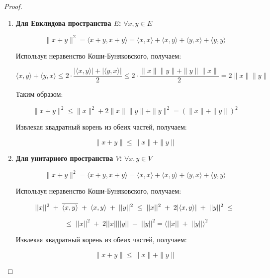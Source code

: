 \documentclass[12px]{report}
\begin{document}
\vspace{0.2cm}
\begin{proof}
    \begin{enumerate}
        \item \textbf{Для Евклидова пространства \( E \):} \quad \(\forall x, y \in E\)
        
        \[
        \|x + y\|^2 = \langle x + y, x + y \rangle = \langle x, x \rangle + \langle x, y \rangle + \langle y, x \rangle + \langle y, y \rangle
        \]
        
        Используя неравенство Коши-Буняковского, получаем:
        
        \[
        \langle x, y \rangle + \langle y, x \rangle \leq 2 \cdot \frac{|\langle x, y \rangle| + |\langle y, x \rangle|}{2} \leq 2 \cdot \frac{\|x\| \|y\| + \|y\| \|x\|}{2} = 2 \|x\| \|y\|
        \]
        
        Таким образом:
        
        \[
        \|x + y\|^2 \leq \|x\|^2 + 2 \|x\| \|y\| + \|y\|^2 = (\|x\| + \|y\|)^2
        \]
        
        Извлекая квадратный корень из обеих частей, получаем:
        
        \[
        \|x + y\| \leq \|x\| + \|y\|
        \]
        
        \item \textbf{Для унитарного пространства \( V \):} \quad \(\forall x, y \in V\)
        
        \[
        \|x + y\|^2 = \langle x + y, x + y \rangle = \langle x, x \rangle + \langle x, y \rangle + \langle y, x \rangle + \langle y, y \rangle
        \]
        
        Используя неравенство Коши-Буняковского, получаем:
        
        \[
        ||x||^2 \; + \; \overline{\langle x, y \rangle} \; + \; \langle x ,y \rangle \; + \; ||y||^2 \; \leq \; ||x||^2 \; + \; 2 |\langle x,y \rangle | \; + \; ||y||^2  \; \leq \newline 
        \]
        
        $$\; \leq \; ||x||^2 \; + \; 2 ||x|| ||y|| \; + \; ||y||^2 = \langle ||x|| \; + \; ||y|| \rangle^2$$
        
        
        Извлекая квадратный корень из обеих частей, получаем:
        
        
        $$\|x + y\| \leq \|x\| + \|y\|$$
        
   
        
    \end{enumerate}
\end{proof}
\end{document}
